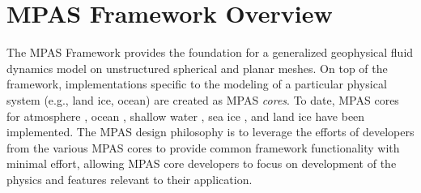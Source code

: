 \chapter{MPAS Framework Overview}
\label{chap:mpas_framework_overview}

The MPAS Framework provides the foundation for a generalized geophysical fluid dynamics model on unstructured spherical and planar meshes.
On top of the framework, implementations specific to the modeling of a particular physical system (e.g., land ice, ocean) are created as MPAS \emph{cores}.
To date, MPAS cores for atmosphere \citep{Skamarock2012}, ocean \citep{Ringler2013, Petersen2015, Petersen2018}, shallow water \citep{Ringler2011}, sea ice \citep{Turner2018}, and land ice \citep{Hoffman2018} have been implemented.
The MPAS design philosophy is to leverage the efforts of developers from the various MPAS cores to provide common framework functionality with minimal effort,
allowing MPAS core developers to focus on development of the physics and features relevant to their application.

